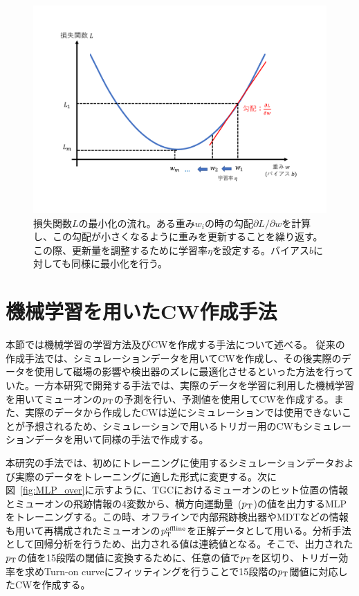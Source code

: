 \begin{figure}[tb]
  \centering
  \includegraphics[clip, width=15cm]{fig/4/lossfunc_laerning.pdf}
  \caption{損失関数$L$の最小化の流れ。ある重み$w_i$の時の勾配${\partial L}/{\partial w}$を計算し、この勾配が小さくなるように重みを更新することを繰り返す。この際、更新量を調整するために学習率$\eta$を設定する。バイアス$b$に対しても同様に最小化を行う。}
  \label{fig:lossfunction}
\end{figure}



\section{機械学習を用いたCW作成手法}
本節では機械学習の学習方法及びCWを作成する手法について述べる。
従来の作成手法では、シミュレーションデータを用いてCWを作成し、その後実際のデータを使用して磁場の影響や検出器のズレに最適化させるといった方法を行っていた。一方本研究で開発する手法では、実際のデータを学習に利用した機械学習を用いてミューオンの$p_{\rm{T}}$の予測を行い、予測値を使用してCWを作成する。また、実際のデータから作成したCWは逆にシミュレーションでは使用できないことが予想されるため、シミュレーションで用いるトリガー用のCWもシミュレーションデータを用いて同様の手法で作成する。

本研究の手法では、初めにトレーニングに使用するシミュレーションデータおよび実際のデータをトレーニングに適した形式に変更する。次に図~\ref{fig:MLP_over}に示すように、TGCにおけるミューオンのヒット位置の情報とミューオンの飛跡情報の4変数から、横方向運動量~($p_{\rm{T}}$)の値を出力するMLPをトレーニングする。この時、オフラインで内部飛跡検出器やMDTなどの情報も用いて再構成されたミューオンの$p_{\rm{T}}^{\rm{offline}}$を正解データとして用いる。分析手法として回帰分析を行うため、出力される値は連続値となる。そこで、出力された$p_{\rm{T}}$の値を15段階の閾値に変換するために、任意の値で$p_{\rm{T}}$を区切り、トリガー効率を求めTurn-on curveにフィッティングを行うことで15段階の$p_{\rm{T}}$閾値に対応したCWを作成する。

